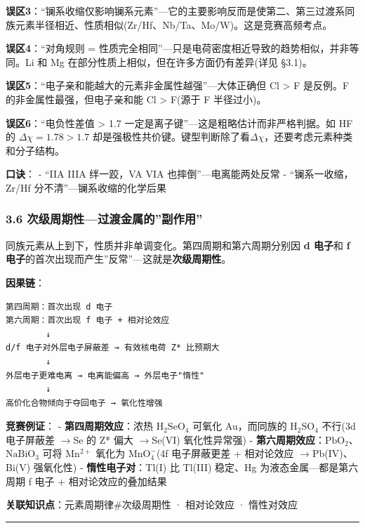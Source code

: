 \documentclass[a4paper,11pt]{ctexart}
\newcommand{\箭}{\ensuremath{\rightarrow}}
\newcommand{\左箭}{\ensuremath{\leftarrow}}
\newcommand{\上箭}{\ensuremath{\uparrow}}
\newcommand{\下箭}{\ensuremath{\downarrow}}
\newcommand{\衡}{\ensuremath{\rightleftharpoons}}
\newcommand{\双箭}{\ensuremath{\leftrightarrow}}
\newcommand{\约等于}{\ensuremath{\approx}}
\newcommand{\小于等于}{\ensuremath{\leq}}
\newcommand{\大于等于}{\ensuremath{\geq}}
\newcommand{\不等于}{\ensuremath{\neq}}
\newcommand{\西格马}{\ensuremath{\sigma}}
\newcommand{\派}{\ensuremath{\pi}}
\begin{document}
\textbf{误区3}：``镧系收缩仅影响镧系元素''---它的主要影响反而是使第二、第三过渡系同族元素半径相近、性质相似(Zr/Hf、Nb/Ta、Mo/W)。这是竞赛高频考点。

\textbf{误区4}：``对角规则 = 性质完全相同''---只是电荷密度相近导致的趋势相似，并非等同。Li 和 Mg 在部分性质上相似，但在许多方面仍有差异(详见 §3.1)。

\textbf{误区5}：``电子亲和能越大的元素非金属性越强''---大体正确但 Cl \textgreater{} F 是反例。F 的非金属性最强，但电子亲和能 Cl \textgreater{} F(源于 F 半径过小)。

\textbf{误区6}：``电负性差值 \textgreater{} 1.7 一定是离子键''---这是粗略估计而非严格判据。如 HF 的 \(\Delta\chi=1.78>1.7\) 却是强极性共价键。键型判断除了看\(\Delta\chi\)，还要考虑元素种类和分子结构。

\textbf{口诀}：
- ``IIA IIIA 绊一跤，VA VIA 也摔倒''---电离能两处反常
- ``镧系一收缩，Zr/Hf 分不清''---镧系收缩的化学后果

\subsubsection{3.6 次级周期性---过渡金属的''副作用''}\label{ux6b21ux7ea7ux5468ux671fux6027ux8fc7ux6e21ux91d1ux5c5eux7684ux526fux4f5cux7528}

同族元素从上到下，性质并非单调变化。第四周期和第六周期分别因 \textbf{d 电子}和 \textbf{f 电子}的首次出现而产生''反常''---这就是\textbf{次级周期性}。

\textbf{因果链}：

\begin{verbatim}
第四周期：首次出现 d 电子
第六周期：首次出现 f 电子 + 相对论效应
        ↓
d/f 电子对外层电子屏蔽差 → 有效核电荷 Z* 比预期大
        ↓
外层电子更难电离 → 电离能偏高 → 外层电子"惰性"
        ↓
高价化合物倾向于夺回电子 → 氧化性增强
\end{verbatim}

\textbf{竞赛例证}：
- \textbf{第四周期效应}：浓热 \(\mathrm{H_2SeO_4}\) 可氧化 Au，而同族的 \(\mathrm{H_2SO_4}\) 不行(3d 电子屏蔽差 \箭 Se 的 Z* 偏大 \箭 Se(VI) 氧化性异常强)
- \textbf{第六周期效应}：\(\mathrm{PbO_2}\)、\(\mathrm{NaBiO_3}\) 可将 \(\mathrm{Mn^{2+}}\) 氧化为 \(\mathrm{MnO_4^-}\)(4f 电子屏蔽更差 + 相对论效应 \箭 Pb(IV)、Bi(V) 强氧化性)
- \textbf{惰性电子对}：Tl(I) 比 Tl(III) 稳定、Hg 为液态金属---都是第六周期 f 电子 + 相对论效应的叠加结果

\textbf{关联知识点}：元素周期律\#次级周期性 · 相对论效应 · 惰性对效应

\begin{center}\rule{0.5\linewidth}{0.5pt}\end{center}
\end{document}
